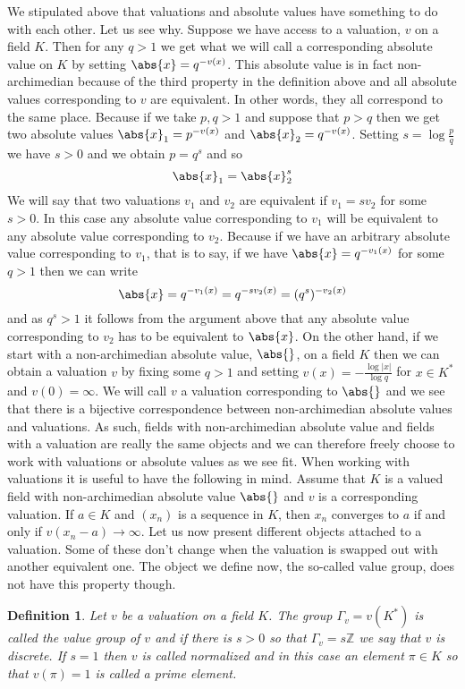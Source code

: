 \documentclass{article}
\newtheorem{definition}{Definition}[section]
\newcommand{\mbb}[1]{\mathbb{#1}}
\begin{document}
We stipulated above that valuations and absolute values have something to do with each other. Let us see why. Suppose we have access to a valuation, $v$ on a field $K$. Then for any $q > 1$ we get what we will call a corresponding absolute value on $K$ by setting $\abs{x} = q^{-v(x)}$. This absolute value is in fact non-archimedian because of the third property in the definition above and all absolute values corresponding to $v$ are equivalent. In other words, they all correspond to the same place. Because if we take $p,q > 1$ and suppose that $p > q$ then we get two absolute values $\abs{x}_1 = p^{-v(x)}$ and $\abs{x}_2 = q^{-v(x)}$. Setting $s = \log \frac{p}{q}$ we have $s > 0$ and we obtain $p = q^s$ and so 
$$\abs{x}_1 = \abs{x}_2^s$$
We will say that two valuations $v_1$ and $v_2$ are equivalent if $v_1 = sv_2$ for some $s > 0$. In this case any absolute value corresponding to $v_1$ will be equivalent to any absolute value corresponding to $v_2$. Because if we have an arbitrary absolute value corresponding to $v_1$, that is to say, if we have $\abs{x} = q^{-v_1(x)}$ for some $q > 1$ then we can write 
$$\abs{x} = q^{-v_1(x)} = q^{-sv_2(x)} = (q^s)^{-v_2(x)}$$
and as $q^s > 1$ it follows from the argument above that any absolute value corresponding to $v_2$ has to be equivalent to $\abs{x}$. On the other hand, if we start with a non-archimedian absolute value, $\abs{}$, on a field $K$ then we can obtain a valuation $v$ by fixing some $q > 1$ and setting $v(x) = -\frac{\log |x|}{\log q}$ for $x \in K^*$ and $v(0) = \infty$. We will call $v$ a valuation corresponding to $\abs{}$ and we see that there is a bijective correspondence between non-archimedian absolute values and valuations. As such, fields with non-archimedian absolute value and fields with a valuation are really the same objects and we can therefore freely choose to work with valuations or absolute values as we see fit. When working with valuations it is useful to have the following in mind. Assume that $K$ is a valued field with non-archimedian absolute value $\abs{}$ and $v$ is a corresponding valuation. If $a \in K$ and $(x_n)$ is a sequence in $K$, then $x_n$ converges to $a$ if and only if $v(x_n - a) \to \infty$. Let us now present different objects attached to a valuation. Some of these don't change when the valuation is swapped out with another equivalent one. The object we define now, the so-called value group, does not have this property though.

\begin{definition}
    Let $v$ be a valuation on a field $K$. The group $\Gamma_v = v(K^*)$ is called the value group of $v$ and if there is $s > 0$ so that $\Gamma_v = s\mbb Z$ we say that $v$ is discrete. If $s = 1$ then $v$ is called normalized and in this case an element $\pi \in K$ so that $v(\pi) = 1$ is called a prime element. 
\end{definition}
\end{document}
